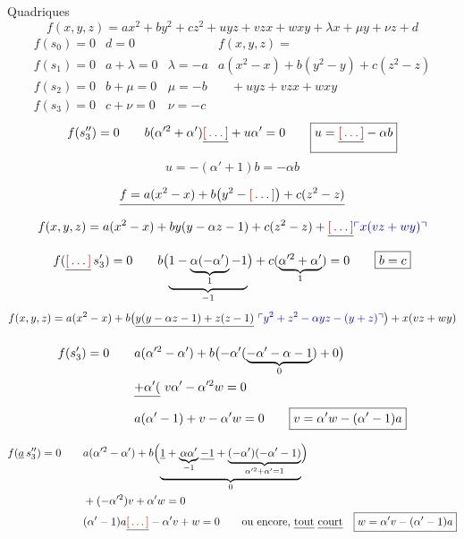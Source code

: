 \documentclass[11pt,a4paper]{article}
\begin{document}
Quadriques 
\[ f(x, y, z) = ax^2 + by^2 + cz^2 + uyz + vzx + wxy + \lambda x + \mu y + \nu z + d \]
\[ \begin{array}{lll|l}
f(s_0) = 0 & \boxed{d = 0} & & f(x, y, z) = \\
f(s_1) = 0 & a + \lambda = 0 & \boxed{\lambda = -a} & a(x^2 - x) + b(y^2 - y) + c(z^2 - z) \\
f(s_2) = 0 & b + \mu = 0 & \boxed{\mu = -b} & \quad + uyz + vzx + wxy \\
f(s_3) = 0 & c + \nu = 0 & \boxed{\nu = -c} &
\end{array} \]
\[ f(s''_3) = 0 \qquad b(\alpha'^2 + \alpha') \struck{\ill{}} + u\alpha' = 0 \qquad \boxed{u = \struck{\ill{}} -\alpha b} \]
\[ u = -(\alpha' + 1)b = -\alpha b \]

\[ \struck{f = a(x^2 - x) + b\bigl(y^2 - \ill{}\bigr) + c(z^2 - z)} \]
\[ f(x, y, z) = a(x^2 - x) + by(y - \alpha z - 1) + c(z^2 - z) + \struck{\ill{}} \add{x(vz + wy)} \]
\[ f(\struck{\ill{}}\,s'_3) = 0 \qquad b\bigl(\underbrace{1 - \underbrace{\alpha(-\alpha')}_{1} - 1}_{-1}\bigr) + c(\underbrace{\alpha'^2 + \alpha'}_{1}) = 0 \qquad \boxed{b = c} \]
\[ f(x, y, z) = a(x^2 - x) + b\bigl(\struck{y(y - \alpha z - 1) + z(z - 1)}\ \add{y^2 + z^2 - \alpha yz - (y + z)}\bigr) + x(vz + wy) \]

\begin{align*}
f(s'_3) = 0 \qquad & a(\alpha'^2 - \alpha') + b\bigl(-\alpha'(\underbrace{-\alpha' - \alpha - 1}_{0}) + 0\bigr) \\
& \struck{+ \alpha'(}\ v\alpha' - \alpha'^2 w = 0 \\
& a(\alpha' - 1) + v - \alpha' w = 0 \qquad \boxed{v = \alpha' w - (\alpha' - 1)a}
\end{align*}

\begin{align*}
f(\underline{a}\,s''_3) = 0 \qquad & a(\alpha'^2 - \alpha') + b\Bigl(\underbrace{\struck{1} + \underbrace{\alpha\alpha'}_{-1} \struck{- 1} + \underbrace{(-\alpha')(-\alpha' - 1)}_{\alpha'^2 + \alpha' = 1}}_{0}\Bigr) \\
& + (-\alpha'^2)v + \alpha' w = 0 \\
& (\alpha' - 1)a \struck{\ill{}} - \alpha' v + w = 0 \qquad \text{ou encore, \uncertain{tout} \uncertain{court}} \quad \boxed{w = \alpha' v - (\alpha' - 1)a}
\end{align*}
\end{document}
